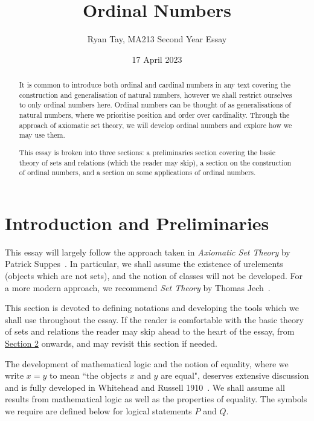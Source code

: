 \documentclass[a4paper,11pt]{article}
\title{Ordinal Numbers}
\author{Ryan Tay, MA213 Second Year Essay}
\date{17 April 2023}
\theoremstyle{plain}
\theoremstyle{definition}
\theoremstyle{remark}
\begin{document}
\maketitle

\begin{abstract}
It is common to introduce both ordinal and cardinal numbers in any text covering the construction and generalisation of natural numbers, however we shall restrict ourselves to only ordinal numbers here. Ordinal numbers can be thought of as generalisations of natural numbers, where we prioritise position and order over cardinality. Through the approach of axiomatic set theory, we will develop ordinal numbers and explore how we may use them.

This essay is broken into three sections: a preliminaries section covering the basic theory of sets and relations (which the reader may skip), a section on the construction of ordinal numbers, and a section on some applications of ordinal numbers.
\end{abstract}

\tableofcontents
\pagebreak

\section{Introduction and Preliminaries}
\label{sec:Prelim}
This essay will largely follow the approach taken in \textit{Axiomatic Set Theory} by Patrick Suppes~\citep{SuppesBook}. In particular, we shall assume the existence of urelements (objects which are not sets), and the notion of classes will not be developed. For a more modern approach, we recommend \textit{Set Theory} by Thomas Jech~\citep{JechBook}.

This section is devoted to defining notations and developing the tools which we shall use throughout the essay. If the reader is comfortable with the basic theory of sets and relations the reader may skip ahead to the heart of the essay, from \hyperref[sec:OrdinalNumbers]{Section 2} onwards, and may revisit this section if needed.

The development of mathematical logic and the notion of equality, where we write $x=y$ to mean ``the objects $x$ and $y$ are equal", deserves extensive discussion and is fully developed in Whitehead and Russell 1910~\cite{Principia}. We shall assume all results from mathematical logic as well as the properties of equality. The symbols we require are defined below for logical statements $P$ and $Q$.
\end{document}
